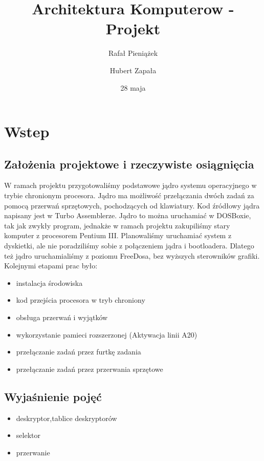 \documentclass[a4paper,12pt]{article}
\title{Architektura Komputerow - Projekt}
\author{Rafał Pieniążek \and Hubert Zapała}
\date{28 maja}
\begin{document}
\maketitle
\newpage
\tableofcontents %
\newpage
	
	\section{Wstep}
		\subsection{Założenia projektowe i rzeczywiste osiągnięcia}
		W ramach projektu przygotowaliśmy podstawowe jądro systemu operacyjnego w trybie chronionym procesora. Jądro ma możliwość przełączania dwóch zadań za pomocą przerwań sprzętowych, pochodzących od klawiatury. Kod źródłowy jądra napisany jest w Turbo Assemblerze. Jądro to można uruchamiać w DOSBoxie, tak jak zwykły program, jednakże w ramach projektu zakupiliśmy stary komputer z procesorem Pentium III. Planowaliśmy uruchamiać system z dyskietki, ale nie poradziliśmy sobie z połączeniem jądra i bootloadera. Dlatego też jądro uruchamialiśmy z poziomu FreeDosa, bez  wyższych sterowników grafiki. Kolejnymi etapami prac było:
			\begin{itemize}
				\item{instalacja środowiska}
				\item{kod przejścia procesora w tryb chroniony}
				\item{obsługa przerwań i wyjątków}
				\item{wykorzystanie pamieci rozszerzonej } (Aktywacja linii A20)
				\item{przełączanie zadań przez furtkę zadania }	
				\item{przełączanie zadań przez przerwania sprzętowe }	
			\end{itemize}
	\subsection{Wyjaśnienie pojęć}
		\begin{itemize}
				\item{deskryptor,tablice deskryptorów}
				\item{selektor}
				\item{przerwanie}
			\end{itemize}
	
\end{document}
